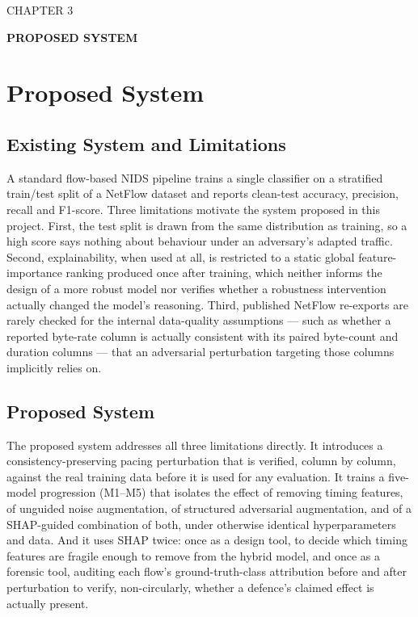 \documentclass[12pt,a4paper]{report}
\begin{document}
\begin{center}CHAPTER 3\end{center}
\begin{center}\textbf{PROPOSED SYSTEM}\end{center}\vspace{4pt}
\chapter{Proposed System}
\section{Existing System and Limitations}
A standard flow-based NIDS pipeline trains a single classifier on a stratified train/test split of a NetFlow dataset and reports clean-test accuracy, precision, recall and F1-score. Three limitations motivate the system proposed in this project. First, the test split is drawn from the same distribution as training, so a high score says nothing about behaviour under an adversary's adapted traffic. Second, explainability, when used at all, is restricted to a static global feature-importance ranking produced once after training, which neither informs the design of a more robust model nor verifies whether a robustness intervention actually changed the model's reasoning. Third, published NetFlow re-exports are rarely checked for the internal data-quality assumptions --- such as whether a reported byte-rate column is actually consistent with its paired byte-count and duration columns --- that an adversarial perturbation targeting those columns implicitly relies on.

\section{Proposed System}
The proposed system addresses all three limitations directly. It introduces a consistency-preserving pacing perturbation that is verified, column by column, against the real training data before it is used for any evaluation. It trains a five-model progression (M1--M5) that isolates the effect of removing timing features, of unguided noise augmentation, of structured adversarial augmentation, and of a SHAP-guided combination of both, under otherwise identical hyperparameters and data. And it uses SHAP twice: once as a design tool, to decide which timing features are fragile enough to remove from the hybrid model, and once as a forensic tool, auditing each flow's ground-truth-class attribution before and after perturbation to verify, non-circularly, whether a defence's claimed effect is actually present.
\end{document}

